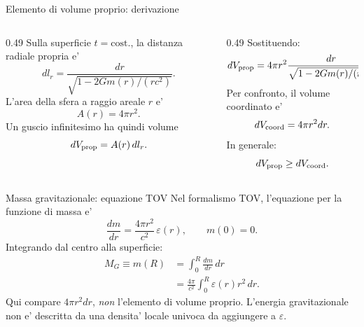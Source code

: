 \begin{frame}{Elemento di volume proprio: derivazione}
\small
\begin{columns}[T,onlytextwidth]
\begin{column}{0.49\textwidth}
Sulla superficie $t=\mathrm{cost.}$,
la distanza radiale propria e'
\[
dl_r=\frac{dr}{\sqrt{1-2Gm(r)/(rc^2)}}.
\]
L'area della sfera a raggio areale $r$ e'
\[
A(r)=4\pi r^2.
\]
Un guscio infinitesimo ha quindi volume
\[
dV_{\rm prop}=A(r)\,dl_r.
\]
\end{column}
\begin{column}{0.49\textwidth}
Sostituendo:
\[
\begin{aligned}
dV_{\rm prop}
&=4\pi r^2
\frac{dr}{\sqrt{1-2Gm(r)/(rc^2)}}.
\end{aligned}
\]
Per confronto, il volume coordinato e'
\[
dV_{\rm coord}=4\pi r^2dr.
\]
In generale:
\[
dV_{\rm prop}\geq dV_{\rm coord}.
\]
\end{column}
\end{columns}
\end{frame}

\begin{frame}{Massa gravitazionale: equazione TOV}
\small
Nel formalismo TOV, l'equazione per la funzione di massa e'
\[
\frac{dm}{dr}=\frac{4\pi r^2}{c^2}\,\varepsilon(r),
\qquad m(0)=0.
\]
Integrando dal centro alla superficie:
\[
\begin{aligned}
M_G\equiv m(R)
&=\int_0^R\frac{dm}{dr}\,dr\\
&=\frac{4\pi}{c^2}\int_0^R\varepsilon(r)r^2\,dr.
\end{aligned}
\]
\medskip
Qui compare $4\pi r^2dr$, \emph{non} l'elemento di volume proprio.
L'energia gravitazionale non e' descritta da una densita' locale
univoca da aggiungere a $\varepsilon$.
\end{frame}

